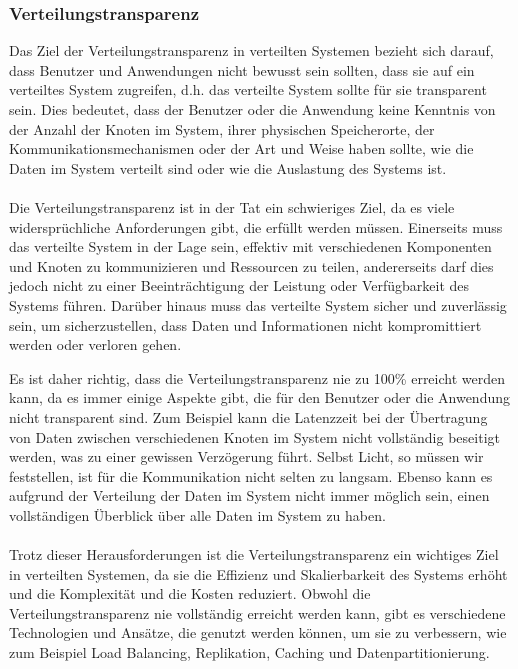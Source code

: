 \documentclass[../vs-script-first-v01.tex]{subfiles}
\begin{document}
\subsubsection{Verteilungstransparenz}

Das Ziel der Verteilungstransparenz in verteilten Systemen bezieht sich darauf, dass Benutzer und Anwendungen nicht bewusst sein sollten, dass sie auf ein verteiltes System zugreifen, d.h. das verteilte System sollte für sie transparent sein. Dies bedeutet, dass der Benutzer oder die Anwendung keine Kenntnis von der Anzahl der Knoten im System, ihrer physischen Speicherorte, der Kommunikationsmechanismen oder der Art und Weise haben sollte, wie die Daten im System verteilt sind oder wie die Auslastung des Systems ist.
\\\\
Die Verteilungstransparenz ist in der Tat ein schwieriges Ziel, da es viele widersprüchliche Anforderungen gibt, die erfüllt werden müssen. Einerseits muss das verteilte System in der Lage sein, effektiv mit verschiedenen Komponenten und Knoten zu kommunizieren und Ressourcen zu teilen, andererseits darf dies jedoch nicht zu einer Beeinträchtigung der Leistung oder Verfügbarkeit des Systems führen. Darüber hinaus muss das verteilte System sicher und zuverlässig sein, um sicherzustellen, dass Daten und Informationen nicht kompromittiert werden oder verloren gehen.

Es ist daher richtig, dass die Verteilungstransparenz nie zu 100\% erreicht werden kann, da es immer einige Aspekte gibt, die für den Benutzer oder die Anwendung nicht transparent sind. Zum Beispiel kann die Latenzzeit bei der Übertragung von Daten zwischen verschiedenen Knoten im System nicht vollständig beseitigt werden, was zu einer gewissen Verzögerung führt.  Selbst Licht, so müssen wir feststellen, ist für die Kommunikation nicht selten zu langsam. Ebenso kann es aufgrund der Verteilung der Daten im System nicht immer möglich sein, einen vollständigen Überblick über alle Daten im System zu haben.
\\\\
Trotz dieser Herausforderungen ist die Verteilungstransparenz ein wichtiges Ziel in verteilten Systemen, da sie die Effizienz und Skalierbarkeit des Systems erhöht und die Komplexität und die Kosten reduziert. Obwohl die Verteilungstransparenz nie vollständig erreicht werden kann, gibt es verschiedene Technologien und Ansätze, die genutzt werden können, um sie zu verbessern, wie zum Beispiel Load Balancing, Replikation, Caching und Datenpartitionierung.
\end{document}

